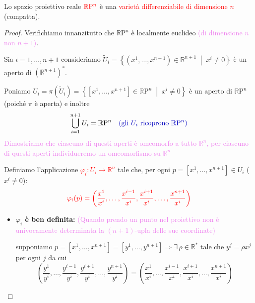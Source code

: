         \begin{proposizione}
        \mbox{}

        Lo spazio proiettivo reale $\textcolor{red}{\mathbb{R}\mathrm{P}^n}$ è una \textcolor{red}{varietà differenziabile di dimensione $n$} (compatta).
        \end{proposizione}

        \begin{proof}
        \mbox{}
        
        Verifichiamo innanzitutto che $\mathbb{R}\mathrm{P}^n$ è localmente euclideo \textcolor{violet}{(di dimensione $n$ non $n+1$)}. 

        Sia $i = 1, \dots, n+1$ consideriamo $ \widetilde{U}_i = \left\{ (x^1, \dots, x^{n+1}) \in \mathbb{R}^{n+1} \;\middle|\; x^i \neq 0 \right\}$
        è un aperto di $(\mathbb{R}^{n+1})^*$. 
        
        Poniamo $U_i = \pi(\widetilde{U}_i) = \left\{ [x^1, \dots, x^{n+1}] \in \mathbb{R}\mathrm{P}^n \;\middle|\; x^i \neq 0 \right\} $
        è un aperto di $\mathbb{R}\mathrm{P}^n$ \textcolor{blu}{(poiché $\pi$ è aperta)} e inoltre
        \[
        \bigcup_{i=1}^{n+1} U_i = \mathbb{R}\mathrm{P}^n \quad \textcolor{blu}{\text{(gli $U_i$ ricoprono $\mathbb{R}\mathrm{P}^n$)}}
        \]
        \textcolor{violet}{Dimostriamo che ciascuno di questi aperti è omeomorfo a tutto $\mathbb{R}^n$, per ciascuno di questi aperti individueremo un omeomorfismo su 
        $\mathbb{R}^n$}

        Definiamo l'applicazione \textcolor{red}{$\varphi_i : U_i \to \mathbb{R}^n$} tale che, per ogni $p = [x^1, \dots, x^{n+1}] \in U_i$ \textcolor{blu}{($x^i \neq 0$)}:
        \[
        \color{red} \varphi_i(p) = \left( \frac{x^1}{x^i}, \dots, \frac{x^{i-1}}{x^i}, \frac{x^{i+1}}{x^i}, \dots, \frac{x^{n+1}}{x^i} \right)
        \]
        \begin{itemize}
            \item \textbf{$\varphi_i$ è ben definita:} \textcolor{violet}{(Quando prendo un punto nel proiettivo non è univocamente determinata la $(n+1)$-upla delle sue coordinate)}
            
            supponiamo $p = [x^1, \dots, x^{n+1}] = [y^1, \dots, y^{n+1}] \Rightarrow \exists\, \rho \in \mathbb{R}^*$ tale che $y^j = \rho x^j$ per ogni $j$ da cui
            \[
            \left( \frac{y^1}{y^i}, \dots, \frac{y^{i-1}}{y^i}, \frac{y^{i+1}}{y^i}, \dots, \frac{y^{n+1}}{y^i} \right) = \left( \frac{x^1}{x^i}, \dots, \frac{x^{i-1}}{x^i}, \frac{x^{i+1}}{x^i}, \dots, \frac{x^{n+1}}{x^i} \right)
            \]
            

\end{itemize}
\end{proof}
